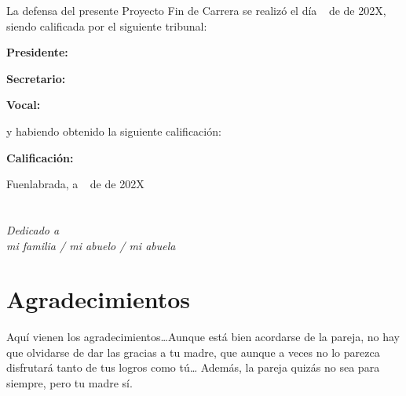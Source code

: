 \documentclass[a4paper, 12pt]{book}
\begin{document}
\vspace{1cm}
La defensa del presente Proyecto Fin de Carrera se realizó el día \qquad$\;\,$ de \qquad\qquad\qquad\qquad \newline de 202X, siendo calificada por el siguiente tribunal:


\vspace{0.5cm}
\textbf{Presidente:}

\vspace{1.2cm}
\textbf{Secretario:}

\vspace{1.2cm}
\textbf{Vocal:}


\vspace{1.2cm}
y habiendo obtenido la siguiente calificación:

\vspace{1cm}
\textbf{Calificación:}


\vspace{1cm}
\begin{flushright}
Fuenlabrada, a \qquad$\;\,$ de \qquad\qquad\qquad\qquad de 202X
\end{flushright}


\chapter*{}
\begin{flushright}
\textit{Dedicado a \\
mi familia / mi abuelo / mi abuela}
\end{flushright}


\chapter*{Agradecimientos}

Aquí vienen los agradecimientos\ldots Aunque está bien acordarse de la pareja, no hay que olvidarse de dar las gracias a tu madre, que aunque a veces no lo parezca disfrutará tanto de tus logros como tú\ldots 
Además, la pareja quizás no sea para siempre, pero tu madre sí.
\end{document}
